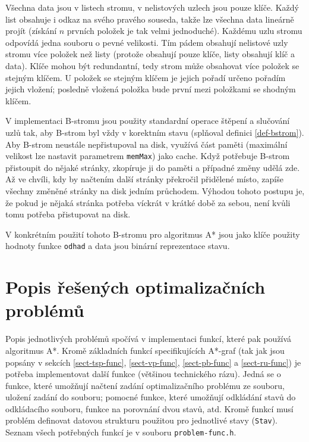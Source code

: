 \documentclass[12pt,notitlepage,fleqn]{report} %
\theoremstyle{definition}
\newcommand{\code}[1]{\texttt{#1}}
\begin{document}
    Všechna data jsou v listech stromu, v nelistových uzlech jsou pouze klíče. Každý list obsahuje i odkaz na svého pravého souseda, takže lze všechna data lineárně projít (získání $n$ prvních položek je tak velmi jednoduché). Každému uzlu stromu odpovídá jedna  souboru o pevné velikosti. Tím pádem obsahují nelistové uzly stromu více položek než listy (protože obsahují pouze klíče, listy obsahují klíč a data). Klíče mohou být redundantní, tedy strom může obsahovat více položek se stejným klíčem. U položek se stejným klíčem je jejich pořadí určeno pořadím jejich vložení; posledně vložená položka bude první mezi položkami se shodným klíčem.
    
    V implementaci B-stromu jsou použity standardní operace štěpení a slučování uzlů tak, aby B-strom byl vždy v korektním stavu (splňoval definici \ref{def-bstrom}). Aby B-strom neustále nepřistupoval na disk, využívá část paměti (maximální velikost lze nastavit parametrem \code{memMax}) jako cache. Když potřebuje B-strom přistoupit do nějaké stránky, zkopíruje ji do paměti a případné změny udělá zde. Až ve chvíli, kdy by načtením další stránky překročil přidělené místo, zapíše všechny změněné stránky na disk jedním průchodem. Výhodou tohoto postupu je, že pokud je nějaká stránka potřeba víckrát v krátké době za sebou, není kvůli tomu potřeba přistupovat na disk.
    
    V konkrétním použití tohoto B-stromu pro algoritmus A* jsou jako klíče použity hodnoty funkce \code{odhad} a data jsou binární reprezentace stavu.

  
  \section{Popis řešených optimalizačních problémů}
    Popis jednotlivých problémů spočívá v implementaci funkcí, které pak používá algoritmus A*. Kromě základních funkcí specifikujících A*-graf (tak jak jsou popsány v sekcích \ref{sect-tsp-func}, \ref{sect-vp-func}, \ref{sect-pb-func} a \ref{sect-ru-func}) je potřeba implementovat další funkce (většinou technického rázu). Jedná se o funkce, které umožňují načtení zadání optimalizačního problému ze souboru, uložení zadání do souboru; pomocné funkce, které umožňují odkládání stavů do odkládacího souboru, funkce na porovnání dvou stavů, atd. Kromě funkcí musí problém definovat datovou strukturu použitou pro jednotlivé stavy (\code{Stav}). Seznam všech potřebných funkcí je v souboru \code{problem-func.h}.
\end{document}
